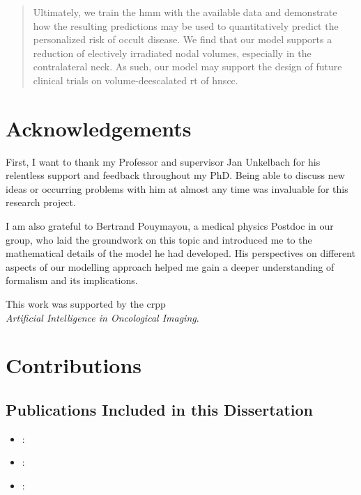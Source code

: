 \documentclass[\relativeRoot/main.tex]{subfiles}
\begin{document}
\begin{abstract}
    Ultimately, we train the \gls{hmm} with the available data and demonstrate how the resulting predictions may be used to quantitatively predict the personalized risk of occult disease. We find that our model supports a reduction of electively irradiated nodal volumes, especially in the contralateral neck. As such, our model may support the design of future clinical trials on volume-deescalated \acrlong{rt} of \gls{hnscc}.
\end{abstract}



\chapter*{Acknowledgements}
\thispagestyle{empty}
First, I want to thank my Professor and supervisor Jan Unkelbach for his relentless support and feedback throughout my PhD. Being able to discuss new ideas or occurring problems with him at almost any time was invaluable for this research project.

I am also grateful to Bertrand Pouymayou, a medical physics Postdoc in our group, who laid the groundwork on this topic and introduced me to the mathematical details of the model he had developed. His perspectives on different aspects of our modelling approach helped me gain a deeper understanding of formalism and its implications.


This work was supported by the \gls{crpp}\\\emph{Artificial Intelligence in Oncological Imaging}.

\chapter*{Contributions}
\section*{Publications Included in this Dissertation}
\begin{itemize}
    \item {}: 
    \item {}: 
    \item {}: 
\end{itemize}
\end{document}
